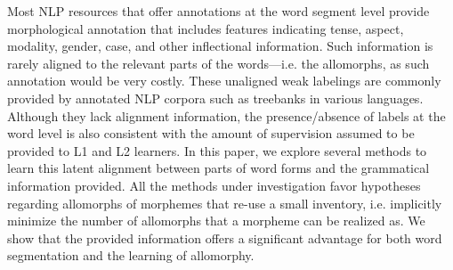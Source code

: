 Most NLP resources that offer annotations at the word segment level provide morphological annotation that includes features indicating tense, aspect, modality, gender, case, and other inflectional information.  Such information is rarely aligned to the relevant parts of the words---i.e. the allomorphs, as such annotation would be very costly.  These unaligned weak labelings are commonly provided by annotated NLP corpora such as treebanks in various languages.  Although they lack alignment information, the presence/absence of labels at the word level is also consistent with the amount of supervision assumed to be provided to L1 and L2 learners. In this paper, we explore several methods to learn this latent alignment between parts of word forms and the grammatical information provided.  All the methods under investigation favor hypotheses regarding allomorphs of morphemes that re-use a small inventory, i.e. implicitly minimize the number of allomorphs that a morpheme can be realized as.  We show that the provided information offers a significant advantage for both word segmentation and the learning of allomorphy.
